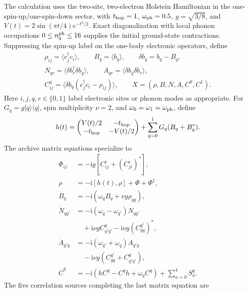 \documentclass[10pt,twocolumn]{article}
\newcommand{\ii}{\mathrm i}
\begin{document}
The calculation uses the two-site, two-electron Holstein Hamiltonian in the
one-spin-up/one-spin-down sector, with $t_{\rm hop}=1$,
$\omega_{\rm ph}=0.5$, $g=\sqrt{3/8}$, and
$V(t)=2\sin(\pi t/4)e^{-t^2/2}$.  Exact diagonalization with local phonon
occupations $0\leq n_q^{\rm ph}\leq16$ supplies the initial ground-state
contractions.  Suppressing the spin-up label on the one-body electronic
operators, define
\begin{equation}
\begin{gathered}
\rho_{ij}=\langle c_j^\dagger c_i\rangle,
\qquad B_q=\langle b_q\rangle,
\qquad \delta b_q=b_q-B_q,\\
N_{qr}=\langle\delta b_r^\dagger\delta b_q\rangle,
\qquad A_{qr}=\langle\delta b_q\delta b_r\rangle,\\
C^q_{ij}=\langle\delta b_q(c_j^\dagger c_i-\rho_{ij})\rangle,
\qquad X=(\rho,B,N,A,C^0,C^1).
\end{gathered}
\label{eq:moments}
\end{equation}
Here $i,j,q,r\in\{0,1\}$ label electronic sites or phonon modes as
appropriate.  For $G_q=g|q\rangle\langle q|$, spin multiplicity $\nu=2$,
and $\omega_0=\omega_1=\omega_{\rm ph}$, define
\begin{equation}
h(t)=
\begin{pmatrix}V(t)/2&-t_{\rm hop}\\-t_{\rm hop}&-V(t)/2\end{pmatrix}
+\sum_{q=0}^{1}G_q(B_q+B_q^*).
\label{eq:one-body-h}
\end{equation}
The archive matrix equations specialize to
\begin{subequations}\label{eq:dimer-eoms}
\begin{align}
\Phi_{ij}&=-\ii g[C^i_{ij}+(C^i_{ji})^*],\\
\dot\rho&=-\ii[h(t),\rho]+\Phi+\Phi^\dagger,\\
\dot B_q&=-\ii(\omega_qB_q+\nu g\rho_{qq}),\\
\dot N_{qq'}&=-\ii(\omega_q-\omega_{q'})N_{qq'}\\
&\quad+\ii\nu gC^q_{q'q'}-\ii\nu g(C^{q'}_{qq})^*,\\
\dot A_{q'q}&=-\ii(\omega_{q'}+\omega_q)A_{q'q}\\
&\quad-\ii\nu g(C^{q'}_{qq}+C^q_{q'q'}),\\
\dot C^q&=-\ii(hC^q-C^qh+\omega_qC^q)+\sum_{a=0}^{4}S_a^q .
\end{align}
\end{subequations}
The five correlation sources completing the last matrix equation are
\end{document}
